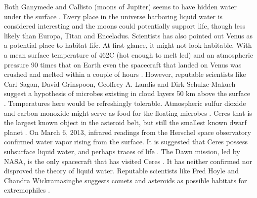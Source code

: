 Both Ganymede and Callisto (moons of Jupiter) seems to have hidden water under the surface \cite{FPlan09}.
Every place in the universe harboring liquid water is considered interesting and the moons could potentially support life, though less likely than Europa, Titan and Enceladus.
Scientists has also pointed out Venus as a potential place to habitat life.
At first glance, it might not look habitable.
With a mean surface temperature of 462\degree C (hot enough to melt led) and an atmospheric pressure 90 times that on Earth even the spacecraft that landed on Venus was crushed and melted within a couple of hours \cite{FPlan17} \cite{FPlan18}.
However, reputable scientists like Carl Sagan, David Grinspoon, Geoffrey A. Landis and Dirk Schulze-Makuch suggest a hypothesis of microbes existing in cloud layers 50 km above the surface \cite{FPlan19}.
Temperatures here would be refreshingly tolerable.
Atmospheric sulfur dioxide and carbon monoxide might serve as food for the floating microbes \cite{FPlan20}.
Ceres that is the largest known object in the asteroid belt, but still the smallest known dwarf planet \cite{FPlan21}.
On March 6, 2013, infrared readings from the Herschel space observatory confirmed water vapor rising from the surface. It is suggested that Ceres possess subsurface liquid water, and perhaps traces of life \cite{FPlan22}.
The Dawn mission, led by NASA, is the only spacecraft that has visited Ceres \cite{FPlan23}.
It has neither confirmed nor disproved the theory of liquid water.
Reputable scientists like Fred Hoyle and Chandra Wickramasinghe suggests comets and asteroids as possible habitats for extremophiles \cite{FPlan19}.